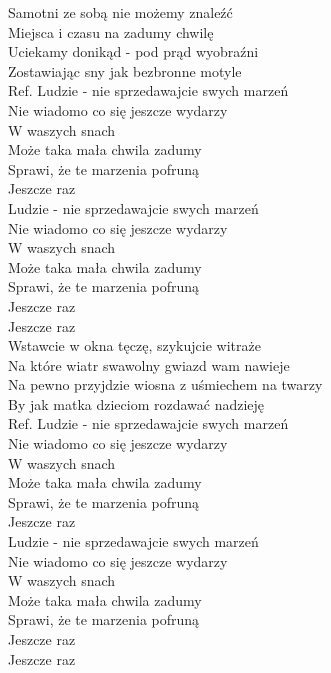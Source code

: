 
Samotni ze sobą nie możemy znaleźć \\
Miejsca i czasu na zadumy chwilę \\
Uciekamy donikąd - pod prąd wyobraźni \\
Zostawiając sny jak bezbronne motyle  \\
\hops
Ref. Ludzie - nie sprzedawajcie swych marzeń \\
 Nie wiadomo co się jeszcze wydarzy \\
 W waszych snach \tab{} \\
 Może taka mała chwila zadumy \\
 Sprawi, że te marzenia pofruną \\
 Jeszcze raz \tab{}\\
\hops
{} Ludzie - nie sprzedawajcie swych marzeń \\
 Nie wiadomo co się jeszcze wydarzy \\
 W waszych snach \tab{}\\
 Może taka mała chwila zadumy \\
 Sprawi, że te marzenia pofruną \\
 Jeszcze raz \tab{}\\
 Jeszcze raz \tab{}\\
\hops
Wstawcie w okna tęczę, szykujcie witraże \\
Na które wiatr swawolny gwiazd wam nawieje \\
Na pewno przyjdzie wiosna z uśmiechem na twarzy \\
By jak matka dzieciom rozdawać nadzieję  \\
\hops
Ref. Ludzie - nie sprzedawajcie swych marzeń\\
 Nie wiadomo co się jeszcze wydarzy\\
 W waszych snach\\
 Może taka mała chwila zadumy\\
 Sprawi, że te marzenia pofruną\\
 Jeszcze raz\\
\hops
{} Ludzie - nie sprzedawajcie swych marzeń\\
 Nie wiadomo co się jeszcze wydarzy\\
 W waszych snach\\
 Może taka mała chwila zadumy\\
 Sprawi, że te marzenia pofruną\\
 Jeszcze raz\\
 Jeszcze raz